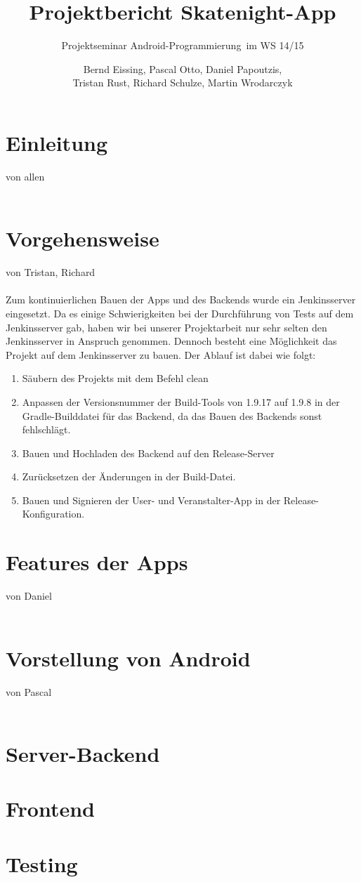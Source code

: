 \documentclass[a4paper, titlepage]{scrartcl}
\title{Projektbericht Skatenight-App}
\subtitle{Projektseminar \glqq Android-Programmierung\grqq\ im WS 14/15}
\author{Bernd Eissing, Pascal Otto, Daniel Papoutzis,\\Tristan Rust, Richard Schulze, Martin Wrodarczyk}
\date{}
\newcommand{\AUTHOR}[1]{
	von #1 \\ \\
}
\begin{document}
\maketitle

\tableofcontents
\newpage

\section{Einleitung}
\AUTHOR{allen}



\section{Vorgehensweise}
\AUTHOR{Tristan, Richard}

Zum kontinuierlichen Bauen der Apps und des Backends wurde ein Jenkinsserver eingesetzt. Da es einige Schwierigkeiten bei der Durchführung von Tests auf dem Jenkinsserver gab, haben wir bei unserer Projektarbeit nur sehr selten den Jenkinsserver in Anspruch genommen. Dennoch besteht eine Möglichkeit das Projekt auf dem Jenkinsserver zu bauen. Der Ablauf ist dabei wie folgt:

\begin{enumerate}
	\item Säubern des Projekts mit dem Befehl \glqq clean\grqq
	\item Anpassen der Versionsnummer der Build-Tools von 1.9.17 auf 1.9.8 in der Gradle-Builddatei für das Backend, da das Bauen des Backends sonst fehlschlägt.
	\item Bauen und Hochladen des Backend auf den Release-Server
	\item Zurücksetzen der Änderungen in der Build-Datei.
	\item Bauen und Signieren der User- und Veranstalter-App in der Release-Konfiguration.
\end{enumerate}

\section{Features der Apps}
\AUTHOR{Daniel}

\section{Vorstellung von Android}
\AUTHOR{Pascal}

\section{Server-Backend}


\section{Frontend}


\section{Testing}

\end{document}
